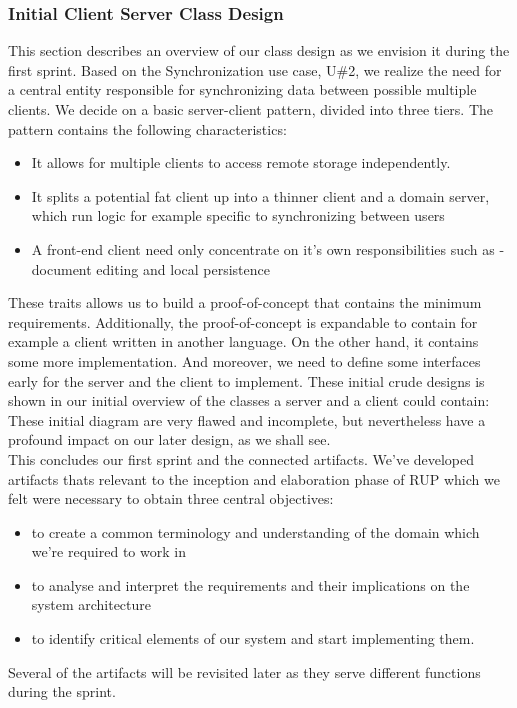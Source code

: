 \subsubsection{Initial Client Server Class Design}
This section describes an overview of our class design as we envision it during the first sprint. Based on the Synchronization use case, U\#2, we realize the need for a central entity responsible for synchronizing data between possible multiple clients. We decide on a basic server-client pattern, divided into three tiers. The pattern contains the following characteristics:\\
\begin{itemize}
\item It allows for multiple clients to access remote storage independently.
\item It splits a potential fat client up into a thinner client and a domain server, which run logic for example specific to synchronizing between users
\item A front-end client need only concentrate on it’s own responsibilities such as - document editing and local persistence
\end{itemize}
These traits allows us to build a proof-of-concept that contains the minimum requirements. Additionally, the proof-of-concept is expandable to contain for example a client written in another language. On the other hand, it contains some more implementation. And moreover, we need to define some interfaces early for the server and the client to implement. These initial crude designs is shown in our initial overview of the classes a server and a client could contain:\\
These initial diagram are very flawed and incomplete, but nevertheless have a profound impact on our later design, as we shall see.\\
\newline
This concludes our first sprint and the connected artifacts. We’ve developed artifacts thats relevant to the inception and elaboration phase of RUP which we felt were necessary to obtain three central objectives:\\
\begin{itemize}
\item to create a common terminology and understanding of the domain which we’re required to work in
\item to analyse and interpret the requirements and their implications on the system architecture
\item to identify critical elements of our system and start implementing them.
\end{itemize}
Several of the artifacts will be revisited later as they serve different functions during the sprint.\\